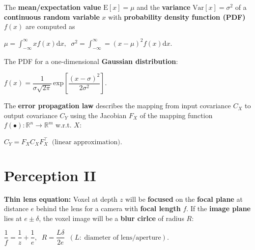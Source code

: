 \documentclass[landscape]{article}
\newcommand{\vmspace}{\vspace{-7pt}}
\newcommand{\vpspace}{\vspace{5pt}}
\newcommand{\vtspace}{\vspace{-10pt}}
\begin{document}
\begin{multicols}{3}
\vpspace

\begin{minipage}{\columnwidth}
  The \textbf{mean/expectation value} $\mathrm{E}[x] = \mu$ and the
  \textbf{variance} $\mathrm{Var}[x] = \sigma^2$ of a \textbf{continuous random
  variable} $x$ with \textbf{probability density function (PDF)} $f(x)$ are
  computed as
  \vmspace
  \begin{center}
    $\mu = \int_{-\infty}^{\infty}xf(x)\mathrm dx,\;\;
    \sigma^2 = \int_{-\infty}^{\infty} = (x - \mu)^2 f(x)
    \mathrm dx.$
  \end{center}
\end{minipage}

\vpspace

\begin{minipage}{\columnwidth}
  The PDF for a one-dimensional \textbf{Gaussian distribution}:
  \vmspace
  \begin{center}
    $f(x) = \dfrac{1}{\sigma \sqrt{2\pi}}\,\mathrm{exp}\left[\dfrac{(x -
    \sigma)^2}{2\sigma^2}\right].$
  \end{center}
\end{minipage}

\vpspace

\begin{minipage}{\columnwidth}
  The \textbf{error propagation law} describes the mapping from input covariance
  $C_X$ to output covariance $C_Y$ using the Jacobian $F_X$ of the mapping
  function $f(\bullet): \mathbb{R}^n \rightarrow \mathbb{R}^m$ w.r.t. $X$:
  \vmspace
  \begin{center}
    $C_Y=F_XC_XF_X^\intercal\;\;\text{(linear approximation)}.$
  \end{center}
\end{minipage}


\vtspace

\section{Perception II}

\vmspace

\begin{minipage}{\columnwidth}
  \textbf{Thin lens equation:} Voxel at depth $z$ will be \textbf{focused} on
  the \textbf{focal plane} at distance $e$ behind the lens for a camera with
  \textbf{focal length} $f$. If the \textbf{image plane} lies at $e \pm \delta$,
  the voxel image will be a \textbf{blur cirlce} of radius $R$:
  \vmspace
  \begin{center}
    $\dfrac{1}{f} = \dfrac{1}{z} + \dfrac{1}{e},\;\; R = \dfrac{L \delta}{2e}
    \;\;
    (L:\;\text{diameter of lens/aperture}).$
  \end{center}
\end{minipage}


\end{multicols}
\end{document}
